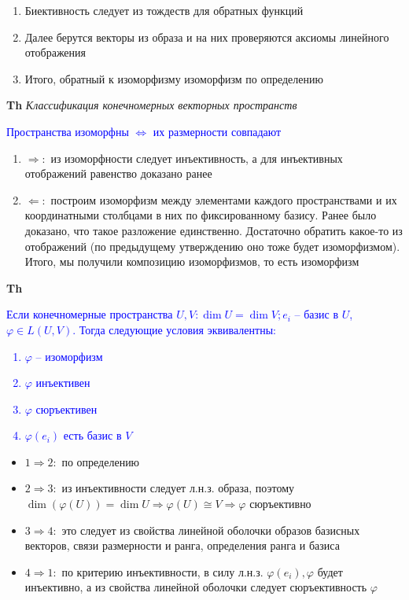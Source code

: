 \begin{enumerate}
    \item Биективность следует из тождеств для обратных функций
    \item Далее берутся векторы из образа и на них проверяются аксиомы линейного отображения
    \item Итого, обратный к изоморфизму изоморфизм по определению
\end{enumerate}

\textbf{Th} \textit{Классификация конечномерных векторных пространств}

\textcolor{blue}{Пространства изоморфны $\Leftrightarrow$ их размерности совпадают}

\begin{enumerate}
    \item $\Rightarrow:$ из изоморфности следует инъективность, а для инъективных отображений равенство доказано ранее
    \item $\Leftarrow:$ построим изоморфизм между элементами каждого пространствами и их координатными столбцами в
    них по фиксированному базису.
    Ранее было доказано, что такое разложение единственно.
    Достаточно обратить какое-то из отображений (по предыдущему утверждению оно тоже будет изоморфизмом).
    Итого, мы получили композицию изоморфизмов, то есть изоморфизм
\end{enumerate}

\textbf{Th} \textcolor{blue}{Если конечномерные пространства $U, V: \dim U = \dim V; e_i$ -- базис в $U$,
    $\varphi \in L(U,V)$. Тогда следующие условия эквивалентны:
    \begin{enumerate}
        \item $\varphi$ -- изоморфизм
        \item $\varphi$ инъективен
        \item $\varphi$ сюръективен
        \item $\varphi (e_i)$ есть базис в $V$
    \end{enumerate}         }

\begin{itemize}
    \item $1 \Rightarrow 2:$ по определению
    \item $2 \Rightarrow 3:$ из инъективности следует л.н.з. образа, поэтому $\dim (\varphi(U)) = \dim U \Rightarrow \varphi(U) \cong V
    \Rightarrow \varphi$ сюръективно
    \item $3 \Rightarrow 4:$ это следует из свойства линейной оболочки образов базисных векторов, связи
    размерности и ранга, определения ранга и базиса
    \item $4 \Rightarrow 1:$ по критерию инъективности, в силу л.н.з. $\varphi (e_i), \varphi$ будет инъективно,
    а из свойства линейной оболочки следует сюръективность $\varphi$
\end{itemize}